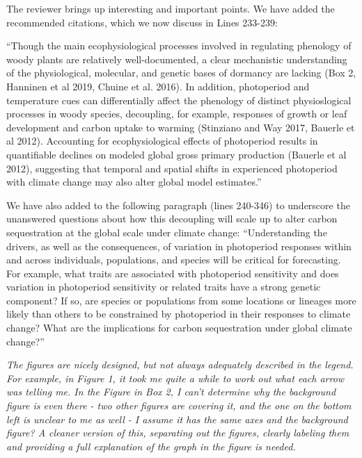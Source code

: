 \documentclass{article}
\begin{document}
\par  The reviewer brings up interesting and important points. We have added the recommended citations, which we now discuss in Lines 233-239:

``Though the main ecophysiological processes involved in regulating phenology of woody plants are relatively well-documented, a clear mechanistic understanding of the physiological, molecular, and genetic bases of dormancy are lacking (Box 2, Hanninen et al 2019, Chuine et al. 2016). In addition, photoperiod and temperature cues can differentially affect the phenology of distinct physioslogical processes in woody species, decoupling, for example, responses of growth or leaf development and carbon uptake to warming (Stinziano and Way 2017, Bauerle et al 2012). Accounting for ecophysiological effects of photoperiod results in quantifiable declines on modeled global gross primary production (Bauerle et al 2012), suggesting that temporal and spatial shifts in experienced photoperiod with climate change may also alter global model estimates.''

\par We have also added to the following paragraph (lines 240-346) to underscore the unanswered questions about how this decoupling will scale up to alter carbon sequestration at the global scale under climate change:
``Understanding the drivers, as well as the consequences, of variation in photoperiod responses within and across individuals, populations, and species will be critical for forecasting.  For example, what traits are associated with photoperiod sensitivity and does variation in photoperiod sensitivity or related traits have a strong genetic component? If so, are species or populations from some locations or lineages more likely than others to be constrained by photoperiod in their responses to climate change? What are the implications for carbon sequestration under global climate change?''


\par \emph{The figures are nicely designed, but not always adequately described in the legend. For example, in Figure 1, it took me quite a while to work out what each arrow was telling me. In the Figure in Box 2, I can't determine why the background figure is even there - two other figures are covering it, and the one on the bottom left is unclear to me as well - I assume it has the same axes and the background figure? A cleaner version of this, separating out the figures, clearly labeling them and providing a full explanation of the graph in the figure is needed.}
\end{document}
